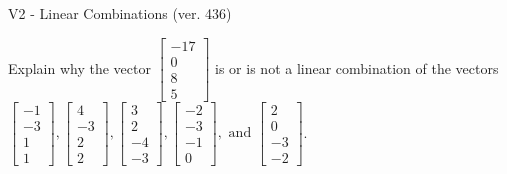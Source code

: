 \begin{exercise}
  \begin{exerciseTitle}V2 - Linear Combinations (ver. 436)\end{exerciseTitle}
  \begin{exerciseStatement}
    Explain why the vector \(\left[\begin{array}{c}
-17 \\
0 \\
8 \\
5
\end{array}\right]\)  is or is not a linear 
	combination of the vectors \(\left[\begin{array}{c}
-1 \\
-3 \\
1 \\
1
\end{array}\right] , \left[\begin{array}{c}
4 \\
-3 \\
2 \\
2
\end{array}\right] , \left[\begin{array}{c}
3 \\
2 \\
-4 \\
-3
\end{array}\right] , \left[\begin{array}{c}
-2 \\
-3 \\
-1 \\
0
\end{array}\right] , \text{ and } \left[\begin{array}{c}
2 \\
0 \\
-3 \\
-2
\end{array}\right]\).
	



\end{exerciseStatement}
\end{exercise}

